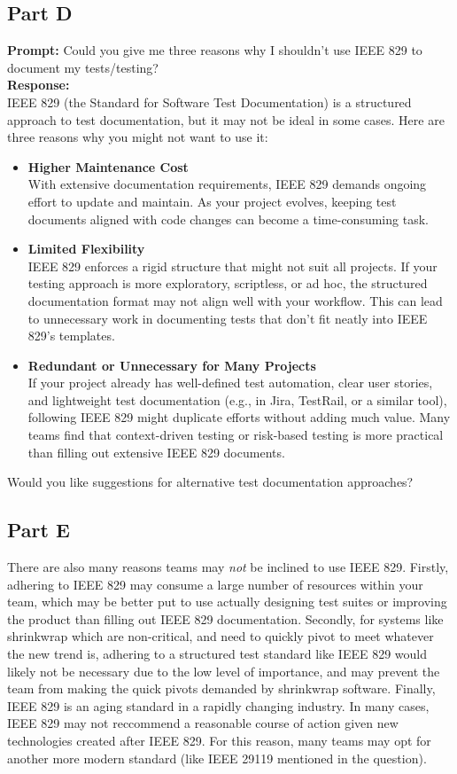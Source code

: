 \documentclass{article}
\begin{document}
\subsection{Part D}
\textbf{Prompt:} Could you give me three reasons why I shouldn't use IEEE 829 to document my tests/testing?\medskip \\
\textbf{Response:}\\
IEEE 829 (the Standard for Software Test Documentation) is a structured approach to test documentation, but it may not be ideal in some cases. Here are three reasons why you might not want to use it:
\begin{itemize}
	\item \textbf{Higher Maintenance Cost}\\ With extensive documentation requirements, IEEE 829 demands ongoing effort to update and maintain. As your project evolves, keeping test documents aligned with
		code changes can become a time-consuming task.

	\item \textbf{Limited Flexibility}\\ IEEE 829 enforces a rigid structure that might not suit all projects. If your testing approach is more exploratory, scriptless, or ad hoc,
		the structured documentation format may not align well with your workflow. This can lead to unnecessary work in documenting tests that don't fit neatly into IEEE 829’s templates.

	\item \textbf{Redundant or Unnecessary for Many Projects}\\ If your project already has well-defined test automation, clear user stories, and lightweight test documentation (e.g., in Jira, TestRail, or a similar tool),
		following IEEE 829 might duplicate efforts without adding much value. Many teams find that context-driven testing or risk-based testing is more practical than filling out extensive IEEE 829 documents.
\end{itemize}
Would you like suggestions for alternative test documentation approaches?
\subsection{Part E}
There are also many reasons teams may \textit{not} be inclined to use IEEE 829. Firstly, adhering to IEEE 829 may consume a large number of resources within your team, which may be better put to use actually
designing test suites or improving the product than filling out IEEE 829 documentation. Secondly, for systems like shrinkwrap which are non-critical, and need to quickly pivot to meet whatever the new trend is,
adhering to a structured test standard like IEEE 829 would likely not be necessary due to the low level of importance, and may prevent the team from making the quick pivots demanded by shrinkwrap software. Finally,
IEEE 829 is an aging standard in a rapidly changing industry. In many cases, IEEE 829 may not reccommend a reasonable course of action given new technologies created after IEEE 829. For this reason, many teams may
opt for another more modern standard (like IEEE 29119 mentioned in the question).
\end{document}
